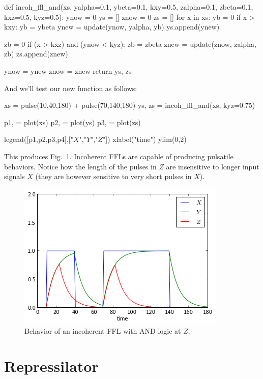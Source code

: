 \begin{python}
def incoh_ffl_and(xs, yalpha=0.1, ybeta=0.1, kxy=0.5, zalpha=0.1, zbeta=0.1, kxz=0.5, kyz=0.5):
    ynow = 0
    ys = []
    znow = 0
    zs = []
    for x in xs:
        yb = 0
        if x > kxy:
            yb = ybeta
        ynew = update(ynow, yalpha, yb)
        ys.append(ynew)

        zb = 0
        if (x > kxz) and (ynow < kyz):
            zb = zbeta
        znew = update(znow, zalpha, zb)
        zs.append(znew)

        ynow = ynew
        znow = znew
    return ys, zs
\end{python}
%
And we'll test our new function as follows:
%
\begin{python}
xs = pulse(10,40,180) + pulse(70,140,180)
ys, zs = incoh_ffl_and(xs, kyz=0.75)

p1, = plot(xs)
p2, = plot(ys)
p3, = plot(zs)

legend([p1,p2,p3,p4],["$X$","$Y$","$Z$"])
xlabel("time")
ylim(0,2)
\end{python}
%
This produces Fig.~\ref{fig:incohfll}.  Incoherent FFLs are capable of producing pulsatile behaviors. Notice how the length of the pulses in $Z$ are insensitive to longer input signals $X$ (they are however sensitive to very short pulses in $X$).
%
\begin{figure}[!ht]
    \centering
    \includegraphics[width=0.33\columnwidth]{./figures/hands-on12/fig-incohffl.png}
    \caption{Behavior of an incoherent FFL with AND logic at $Z$.}\label{fig:incohfll}
\end{figure}

\section{Repressilator}

